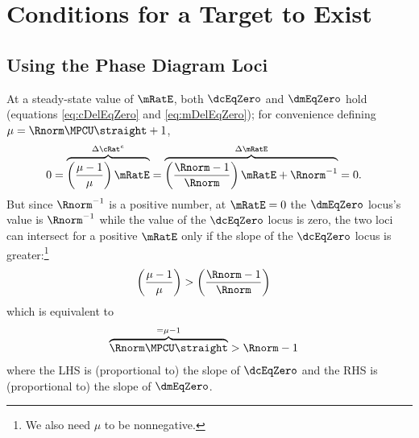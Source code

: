 \documentclass{\handout}
\begin{document}
\section{Conditions for a Target to Exist}\label{sec:mTargExists}

\subsection{Using the Phase Diagram Loci} 
 
At a steady-state value of $\mRatE$, both $\dcEqZero$ and $\dmEqZero$ hold (equations \eqref{eq:cDelEqZero} and \eqref{eq:mDelEqZero}); for convenience defining $\mu = \Rnorm \MPCU \straight + 1$, 
\begin{equation}\begin{gathered}\begin{aligned}
  0 = \overbrace{\left(\frac{\mu-1}{\mu}\right) \mRatE}^{\Delta {\cRat}^{e} } & =  \overbrace{\left(\frac{\Rnorm-1}{\Rnorm}\right)\mRatE + \Rnorm^{-1}}^{\Delta \mRatE} = 0.
\end{aligned}\end{gathered}\end{equation}
But since $\Rnorm^{-1}$ is a positive number, at $\mRatE=0$ the $\dmEqZero$ locus's value is $\Rnorm^{-1}$ while the value of the $\dcEqZero$ locus is zero, the two loci can intersect for a positive $\mRatE$ only if the slope of the $\dcEqZero$ locus is greater:\footnote{We also need $\mu$ to be nonnegative.}
\begin{equation}\begin{gathered}\begin{aligned}
  \left(\frac{\mu-1}{\mu}\right) & >  \left(\frac{\Rnorm-1}{\Rnorm}\right) \label{eq:cDelEq0SlopeCond}
\end{aligned}\end{gathered}\end{equation}
which is equivalent to 
\begin{equation}\begin{gathered}\begin{aligned}
  \overbrace{\Rnorm \MPCU \straight}^{= \mu-1} & >   \Rnorm-1  \label{eq:cDelEq0SlopeCondAlt}
\end{aligned}\end{gathered}\end{equation}
where the LHS is (proportional to) the slope of $\dcEqZero$ and the RHS is (proportional to) the slope of $\dmEqZero$.
\end{document}
